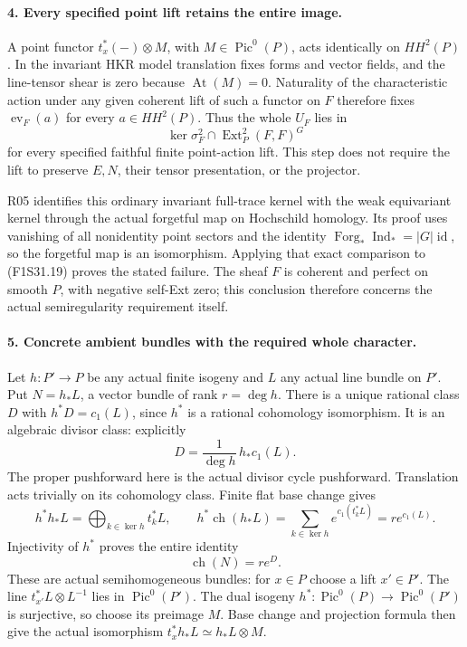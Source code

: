 \paragraph{4. Every specified point lift retains the entire image.}
A point functor $t_x^*(-)\otimes M$, with
$M\in\operatorname{Pic}^0(P)$, acts identically on
$HH^2(P)$. In the invariant HKR model translation
fixes forms and vector fields, and the line-tensor
shear is zero because $\operatorname{At}(M)=0$.
Naturality of the characteristic action under any
given coherent lift of such a functor on $F$ therefore
fixes $\operatorname{ev}_F(a)$ for every $a\in HH^2(P)$.
Thus the whole $U_F$ lies in
\[
                \ker\sigma_F^2\cap
                         \operatorname{Ext}^2_P(F,F)^G
 \tag{F1S31.19}
\]
for every specified faithful finite point-action lift.
This step does not require the lift to preserve
$E,N$, their tensor presentation, or the projector.

R05 identifies this ordinary invariant full-trace
kernel with the weak equivariant kernel through
the actual forgetful map on Hochschild homology.
Its proof uses vanishing of all nonidentity point
sectors and the identity
$\operatorname{Forg}_*\operatorname{Ind}_*
=|G|\operatorname{id}$, so the forgetful map is an
isomorphism. Applying that exact comparison to
(F1S31.19) proves the stated failure. The sheaf $F$
is coherent and perfect on smooth $P$, with negative
self-Ext zero; this conclusion therefore concerns
the actual semiregularity requirement itself.

\paragraph{5. Concrete ambient bundles with the required whole character.}
Let $h:P'\to P$ be any actual finite isogeny and
$L$ any actual line bundle on $P'$. Put $N=h_*L$,
a vector bundle of rank $r=\deg h$.
There is a unique rational class $D$ with
$h^*D=c_1(L)$, since $h^*$ is a rational cohomology
isomorphism. It is an algebraic divisor class:
explicitly
\[
                      D=\frac1{\deg h}\,h_*c_1(L).
 \tag{F1S31.20}
\]
The proper pushforward here is the actual divisor
cycle pushforward. Translation acts trivially on
its cohomology class. Finite flat base change gives
\[
 h^*h_*L=\bigoplus_{k\in\ker h}t_k^*L,
 \qquad
 h^*\operatorname{ch}(h_*L)
       =\sum_{k\in\ker h}e^{c_1(t_k^*L)}
       =r e^{c_1(L)}.
 \tag{F1S31.21}
\]
Injectivity of $h^*$ proves the entire identity
\[
                          \operatorname{ch}(N)=r e^D.
 \tag{F1S31.22}
\]
These are actual semihomogeneous bundles: for $x\in P$
choose a lift $x'\in P'$. The line
$t_{x'}^*L\otimes L^{-1}$ lies in $\operatorname{Pic}^0(P')$.
The dual isogeny $h^*:\operatorname{Pic}^0(P)\to
\operatorname{Pic}^0(P')$ is surjective, so choose its
preimage $M$. Base change and projection formula then
give the actual isomorphism
$t_x^*h_*L\simeq h_*L\otimes M$.

